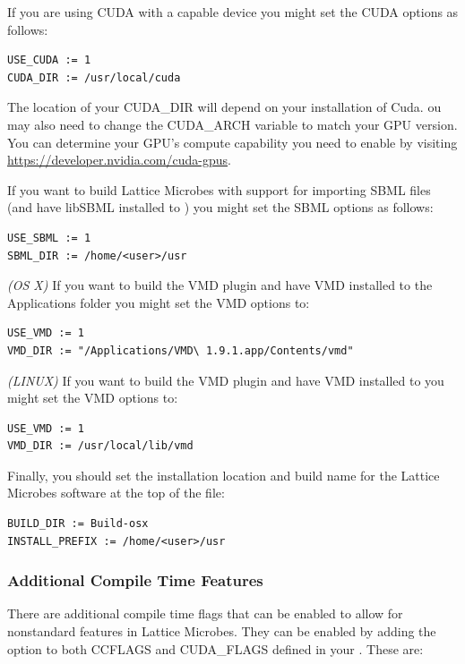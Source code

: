 If you are using CUDA with a capable device you might set the CUDA options as follows:
{\small\begin{verbatim}
USE_CUDA := 1
CUDA_DIR := /usr/local/cuda
\end{verbatim}}

The location of your CUDA\_DIR will depend on your installation of Cuda. ou may also need to change the CUDA\_ARCH variable to match your GPU version. You can determine your GPU's compute capability you need to enable by visiting \url{https://developer.nvidia.com/cuda-gpus}.

If you want to build Lattice Microbes with support for importing SBML files (and have libSBML installed to ) you might set the SBML options as follows:
{\small\begin{verbatim}
USE_SBML := 1
SBML_DIR := /home/<user>/usr
\end{verbatim}}

{\it (OS X)} If you want to build the VMD plugin and have VMD installed to the Applications folder you might set the VMD options to:
{\small\begin{verbatim}
USE_VMD := 1
VMD_DIR := "/Applications/VMD\ 1.9.1.app/Contents/vmd"
\end{verbatim}}

{\it (LINUX)} If you want to build the VMD plugin and have VMD installed to  you might set the VMD options to:
{\small\begin{verbatim}
USE_VMD := 1
VMD_DIR := /usr/local/lib/vmd
\end{verbatim}}

Finally, you should set the installation location and build name for the Lattice Microbes software at the top of the  file:
{\small\begin{verbatim}
BUILD_DIR := Build-osx
INSTALL_PREFIX := /home/<user>/usr
\end{verbatim}}

\subsubsection{Additional Compile Time Features}

There are additional compile time flags that can be enabled to allow for
nonstandard features in Lattice Microbes.  They can be enabled by adding
the option to both CCFLAGS and CUDA\_FLAGS defined in your .
These are:

